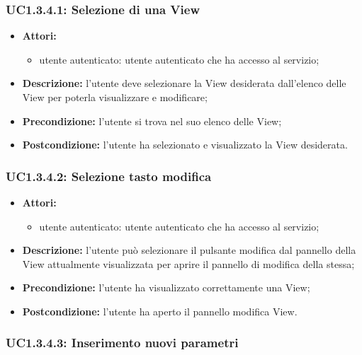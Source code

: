 \subsubsection{UC1.3.4.1: Selezione di una View}

\begin{itemize}
	\item \textbf{Attori:}
	\begin{itemize}
		\item utente autenticato: utente autenticato che ha accesso al servizio;
	\end{itemize}
	\item \textbf{Descrizione:} l'utente deve selezionare la View desiderata dall'elenco delle View per poterla visualizzare e modificare;
	\item \textbf{Precondizione:} l'utente si trova nel suo elenco delle View;
	\item \textbf{Postcondizione:} l'utente ha selezionato e visualizzato la View desiderata.
\end{itemize}

\subsubsection{UC1.3.4.2: Selezione tasto modifica}

\begin{itemize}
	\item \textbf{Attori:}
	\begin{itemize}
		\item utente autenticato: utente autenticato che ha accesso al servizio;
	\end{itemize}
	\item \textbf{Descrizione:} l'utente può selezionare il pulsante modifica dal pannello della View attualmente visualizzata per aprire il pannello di modifica della stessa;
	\item \textbf{Precondizione:} l'utente ha visualizzato correttamente una View;
	\item \textbf{Postcondizione:} l'utente ha aperto il pannello modifica View.
\end{itemize}

\subsubsection{UC1.3.4.3: Inserimento nuovi parametri}

